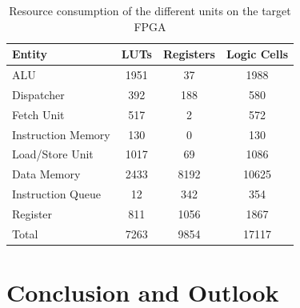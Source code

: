 \documentclass[conference]{IEEEtran}
\begin{document}
\begin{table}
	\caption{Resource consumption of the different units on the target FPGA}
	\centering
	\begin{tabular}{l c c c}
			Entity & LUTs & Registers & Logic Cells \\
		\midrule
			ALU & 1951 & 37 & 1988 \\
			Dispatcher & 392 & 188 & 580 \\
			Fetch Unit & 517 & 2 & 572 \\
			Instruction Memory & 130 & 0 & 130 \\
			Load/Store Unit & 1017 & 69 & 1086 \\
			Data Memory & 2433 & 8192 & 10625 \\
			Instruction Queue & 12 & 342 & 354 \\
			Register & 811 & 1056 & 1867 \\
		\midrule
			Total & 7263 & 9854 & 17117 \\
	\end{tabular}
	\label{tab:resources}
\end{table}



\section{Conclusion and Outlook} \label{sec:conclusion}



\cite{HP}


\printbibliography
\end{document}
